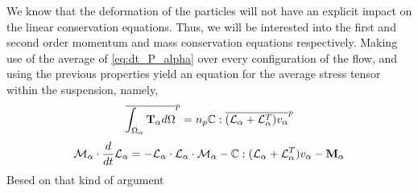 {We know that the deformation of the particles will not have an explicit impact on the linear conservation equations.
Thus, we will be interested into the first and second order momentum and mass conservation equations respectively.
Making use of the average of \ref{eq:dt_P_alpha} over every configuration of the flow, and using the previous properties yield an equation for the average stress tensor within the suspension, namely,
\begin{equation}
    \overline{\int_{\Omega_\alpha}\textbf{T}_\alpha d\Omega}^{p}
    = n_p\mathbb{C} : \overline{(\mathcal{L}_\alpha+ \mathcal{L}_\alpha^T) v_\alpha}^{p}
    \label{eq:hybrid_avg_dt_P_alpha}
\end{equation}
\begin{equation}
    \mathcal{M}_\alpha \cdot\frac{d}{d t} \mathcal{L}_\alpha
    = - \mathcal{L}_\alpha\cdot \mathcal{L}_\alpha\cdot \mathcal{M}_\alpha
    - \mathbb{C} : (\mathcal{L}_\alpha+ \mathcal{L}_\alpha^T) v_\alpha
    - \textbf{M}_\alpha
    \label{eq:hybrid_avg_dt_P_alpha}
\end{equation}
Besed on that kind of argument \citet{lhuillier1987phenomenology}
}


